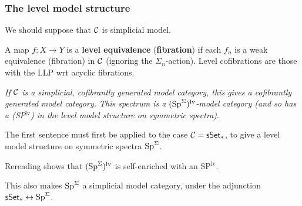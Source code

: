 \documentclass[11pt]{article}
\begin{document}
\begin{MichaelStableModelCats}
\subsubsection*{The level model structure}
\begin{itemise}
\item We should suppose that $\mathcal{C}$ is simplicial model.
\item A map $f:X\to Y$ is a \textbf{level equivalence} (\textbf{fibration}) if each $f_n$ is a weak equivalence (fibration) in $\mathcal{C}$ (ignoring the $\Sigma_n$-action). Level cofibrations are those with the LLP wrt acyclic fibrations.
\item \textit{If $\mathcal{C}$ is a simplicial, cofibrantly generated model category, this gives a cofibrantly generated model category. This spectrum is a $(\operatorname{Sp}^\Sigma)^\textup{lv}$-model category (and so has a \textup{(SP$^\text{lv}$)} in the level model structure on symmetric spectra)}.%
\begin{itemise}
\item The first sentence must first be applied to the case $\mathcal{C}=\operatorname{{\mathsf{sSet}}}_*$, to give a level model structure on symmetric spectra $\operatorname{Sp}^\Sigma$.
\item Rereading shows that $(\operatorname{Sp}^\Sigma)^\text{lv}$ is self-enriched with an SP$^\text{lv}$.
\item This also makes $\operatorname{Sp}^\Sigma$ a simplicial model category, under the adjunction $\operatorname{{\mathsf{sSet}}}_*\leftrightarrow\operatorname{Sp}^\Sigma$.
\end{itemise}
\end{itemise}

\end{MichaelStableModelCats}
\end{document}
